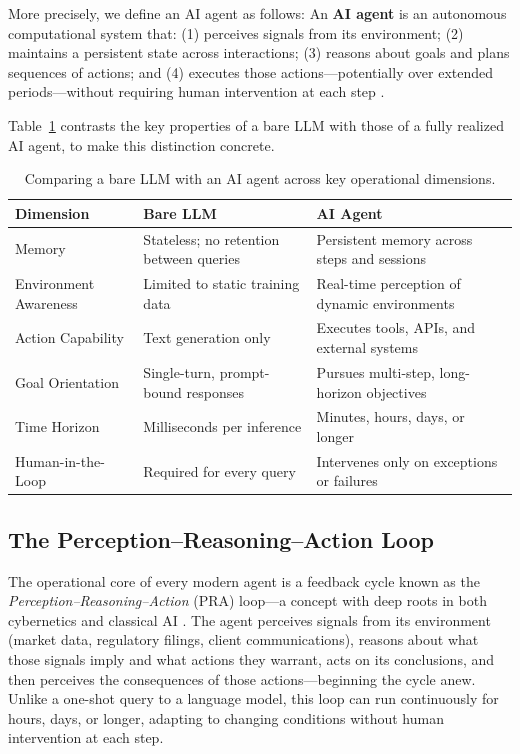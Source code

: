 \documentclass{article}
\begin{document}
More precisely, we define an AI agent as follows: An \textbf{AI agent} is an autonomous computational system that: (1) perceives signals from its environment; (2) maintains a persistent state across interactions; (3) reasons about goals and plans sequences of actions; and (4) executes those actions—potentially over extended periods—without requiring human intervention at each step \cite{russell2020artificial}.

Table~\ref{tab:agent-vs-llm} contrasts the key properties of a bare LLM with those of a fully realized AI agent, to make this distinction concrete.

\begin{table}[ht]
\centering
\caption{Comparing a bare LLM with an AI agent across key operational dimensions.}
\label{tab:agent-vs-llm}
\begin{tabular}{|>{\raggedright\arraybackslash}p{3cm}|>{\raggedright\arraybackslash}p{3.8cm}|>{\raggedright\arraybackslash}p{4cm}|}
\hline
\textbf{Dimension} & \textbf{Bare LLM} & \textbf{AI Agent} \\
\hline
Memory & Stateless; no retention between queries & Persistent memory across steps and sessions \\
\hline
Environment Awareness & Limited to static training data & Real-time perception of dynamic environments \\
\hline
Action Capability & Text generation only & Executes tools, APIs, and external systems \\
\hline
Goal Orientation & Single-turn, prompt-bound responses & Pursues multi-step, long-horizon objectives \\
\hline
Time Horizon & Milliseconds per inference & Minutes, hours, days, or longer \\
\hline
Human-in-the-Loop & Required for every query & Intervenes only on exceptions or failures \\
\hline
\end{tabular}
\end{table}

\subsection{The Perception–Reasoning–Action Loop}

The operational core of every modern agent is a feedback cycle known as the \textit{Perception–Reasoning–Action} (PRA) loop—a concept with deep roots in both cybernetics \cite{wiener1948cybernetics} and classical AI \cite{russell2020artificial}. The agent perceives signals from its environment (market data, regulatory filings, client communications), reasons about what those signals imply and what actions they warrant, acts on its conclusions, and then perceives the consequences of those actions—beginning the cycle anew. Unlike a one-shot query to a language model, this loop can run continuously for hours, days, or longer, adapting to changing conditions without human intervention at each step.
\end{document}
